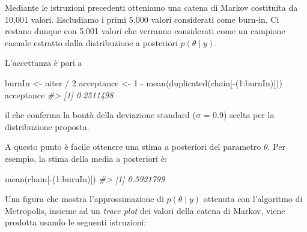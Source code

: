 \documentclass[
]{memoir}
\newenvironment{Shaded}{\begin{snugshade}}{\end{snugshade}}
\newcommand{\CommentTok}[1]{\textcolor[rgb]{0.56,0.35,0.01}{\textit{#1}}}
\newcommand{\DecValTok}[1]{\textcolor[rgb]{0.00,0.00,0.81}{#1}}
\newcommand{\FunctionTok}[1]{\textcolor[rgb]{0.00,0.00,0.00}{#1}}
\newcommand{\NormalTok}[1]{#1}
\newcommand{\OtherTok}[1]{\textcolor[rgb]{0.56,0.35,0.01}{#1}}
\newcommand{\SpecialCharTok}[1]{\textcolor[rgb]{0.00,0.00,0.00}{#1}}
\begin{document}
Mediante le istruzioni precedenti otteniamo una catena di Markov costituita da 10,001 valori. Escludiamo i primi 5,000 valori considerati come burn-in. Ci restano dunque con 5,001 valori che verranno considerati come un campione casuale estratto dalla distribuzione a posteriori \(p(\theta \mid y)\).

L'accettanza è pari a

\begin{Shaded}
\begin{Highlighting}[]
\NormalTok{burnIn }\OtherTok{\textless{}{-}}\NormalTok{ niter }\SpecialCharTok{/} \DecValTok{2}
\NormalTok{acceptance }\OtherTok{\textless{}{-}} \DecValTok{1} \SpecialCharTok{{-}} \FunctionTok{mean}\NormalTok{(}\FunctionTok{duplicated}\NormalTok{(chain[}\SpecialCharTok{{-}}\NormalTok{(}\DecValTok{1}\SpecialCharTok{:}\NormalTok{burnIn)]))}
\NormalTok{acceptance}
\CommentTok{\#\textgreater{} [1] 0.2511498}
\end{Highlighting}
\end{Shaded}

\noindent
il che conferma la bontà della deviazione standard (\(\sigma\) = 0.9) scelta per la distribuzione proposta.

A questo punto è facile ottenere una stima a posteriori del parametro \(\theta\). Per esempio, la stima della media a posteriori è:

\begin{Shaded}
\begin{Highlighting}[]
\FunctionTok{mean}\NormalTok{(chain[}\SpecialCharTok{{-}}\NormalTok{(}\DecValTok{1}\SpecialCharTok{:}\NormalTok{burnIn)])}
\CommentTok{\#\textgreater{} [1] 0.5921799}
\end{Highlighting}
\end{Shaded}

Una figura che mostra l'approssimazione di \(p(\theta \mid y)\) ottenuta con l'algoritmo di Metropolis, insieme ad un \emph{trace plot} dei valori della catena di Markov, viene prodotta usando le seguenti istruzioni:
\end{document}
